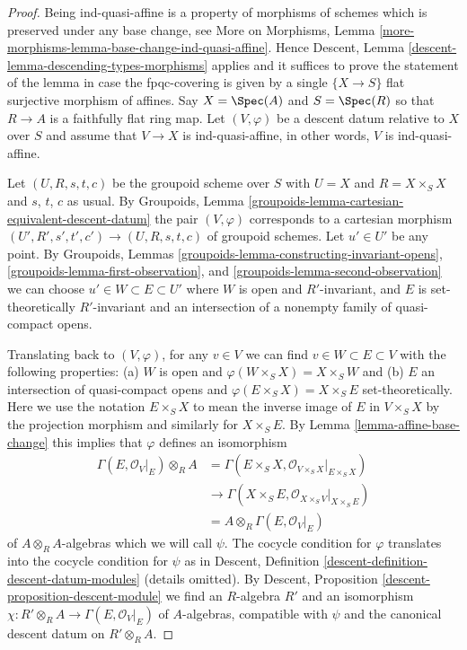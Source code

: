 \begin{proof}
Being ind-quasi-affine is a property of morphisms of schemes
which is preserved under any base change, see
More on Morphisms, Lemma
\ref{more-morphisms-lemma-base-change-ind-quasi-affine}.
Hence Descent, Lemma \ref{descent-lemma-descending-types-morphisms} applies
and it suffices to prove the statement of the lemma
in case the fpqc-covering is given by a single
$\{X \to S\}$ flat surjective morphism of affines.
Say $X = \Spec(A)$ and $S = \Spec(R)$ so
that $R \to A$ is a faithfully flat ring map.
Let $(V, \varphi)$ be a descent datum relative to $X$ over $S$
and assume that $V \to X$ is ind-quasi-affine, in other words,
$V$ is ind-quasi-affine.

\medskip\noindent
Let $(U, R, s, t, c)$ be the groupoid scheme over $S$ with
$U = X$ and $R = X \times_S X$ and $s$, $t$, $c$ as usual.
By Groupoids, Lemma \ref{groupoids-lemma-cartesian-equivalent-descent-datum}
the pair $(V, \varphi)$ corresponds to a cartesian morphism
$(U', R', s', t', c') \to (U, R, s, t, c)$ of groupoid schemes.
Let $u' \in U'$ be any point. By
Groupoids, Lemmas \ref{groupoids-lemma-constructing-invariant-opens},
\ref{groupoids-lemma-first-observation}, and
\ref{groupoids-lemma-second-observation}
we can choose $u' \in W \subset E \subset U'$
where $W$ is open and $R'$-invariant, and
$E$ is set-theoretically $R'$-invariant and
an intersection of a nonempty family of quasi-compact opens.

\medskip\noindent
Translating back to $(V, \varphi)$, for any $v \in V$ we can find
$v \in W \subset E \subset V$ with the following properties:
(a) $W$ is open and $\varphi(W \times_S X) = X \times_S W$ and
(b) $E$ an intersection of quasi-compact opens and
$\varphi(E \times_S X) = X \times_S E$ set-theoretically.
Here we use the notation $E \times_S X$ to mean the
inverse image of $E$ in $V \times_S X$ by the projection morphism and
similarly for $X \times_S E$. By Lemma \ref{lemma-affine-base-change}
this implies that $\varphi$ defines an isomorphism
\begin{align*}
\Gamma(E, \mathcal{O}_V|_E) \otimes_R A
& =
\Gamma(E \times_S X, \mathcal{O}_{V \times_S X}|_{E \times_S X}) \\
& \to
\Gamma(X \times_S E, \mathcal{O}_{X \times_S V}|_{X \times_S E}) \\
& =
A \otimes_R \Gamma(E, \mathcal{O}_V|_E)
\end{align*}
of $A \otimes_R A$-algebras which we will call $\psi$.
The cocycle condition for $\varphi$
translates into the cocycle condition for $\psi$ as in
Descent, Definition \ref{descent-definition-descent-datum-modules}
(details omitted). By Descent, Proposition
\ref{descent-proposition-descent-module}
we find an $R$-algebra $R'$ and an isomorphism
$\chi : R' \otimes_R A \to \Gamma(E, \mathcal{O}_V|_E)$
of $A$-algebras, compatible with $\psi$ and the
canonical descent datum on $R' \otimes_R A$.


\end{proof}
